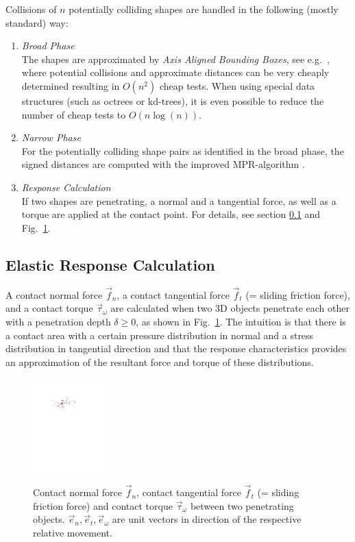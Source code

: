 Collisions of $n$ potentially colliding shapes are handled in the following (mostly standard) way:
\begin{enumerate}
	\item[1. ] \emph{Broad Phase}\\
	The shapes are approximated by \emph{Axis Aligned Bounding Boxes}, see e.g.\ \cite{bergen2003},
    where potential collisions and approximate distances can be very cheaply determined
	resulting in $O(n^2)$ cheap tests. When using special data structures (such as octrees or kd-trees),
	it is even possible to reduce the number of cheap tests to $O(n \log(n))$.
	
	\item[2. ] \emph{Narrow Phase}\\
	For the potentially colliding shape pairs as identified in the broad phase,
	the signed distances are computed with the improved MPR-algorithm \cite{Neumayr2017}.
	
	\item[3. ] \emph{Response Calculation} \\
	If two shapes are penetrating, a normal and a tangential force, as well as a torque are applied at the
	contact point. For details, see section \ref{sec:responseCalculation} and 
    Fig.~\ref{fig:forces}.
\end{enumerate}


\subsection{Elastic Response Calculation}\label{sec:responseCalculation}

A contact normal force $\vec{f}_n$, a contact tangential force $\vec{f}_t$ (= sliding friction force), 
and a contact torque $\vec{\tau}_{\omega}$ are calculated when two 3D objects penetrate each other with a 
penetration depth $\delta \ge 0$, as shown in Fig.~\ref{fig:forces}. The intuition is that
there is a contact area with a certain pressure distribution in normal and a stress
distribution in tangential direction and that the response characteristics provides an
approximation of the resultant force and torque of these distributions.
%

\begin{figure}[t]
	\centering
	\includegraphics[width=0.25\textwidth]{figures/forces.pdf}
	\caption{Contact normal force $\vec{f}_n$, contact tangential force $\vec{f}_t$ 
		(= sliding friction force) and contact torque $\vec{\tau}_{\omega}$
		between two penetrating objects. $\vec{e}_n, \vec{e}_t, \vec{e}_{\omega}$ are unit vectors
		in direction of the respective relative movement.}
	\label{fig:forces}
\end{figure}

